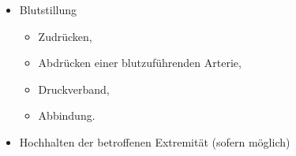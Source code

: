 %
\label{m:ehi-starke-blutung}
\begin{itemize}
  \item Blutstillung
  \begin{itemize}
    \item Zudrücken,
    \item Abdrücken einer blutzuführenden Arterie,
    \item Druckverband,
    \item Abbindung.
  \end{itemize}
  \item Hochhalten der betroffenen Extremität (sofern möglich)
\end{itemize}